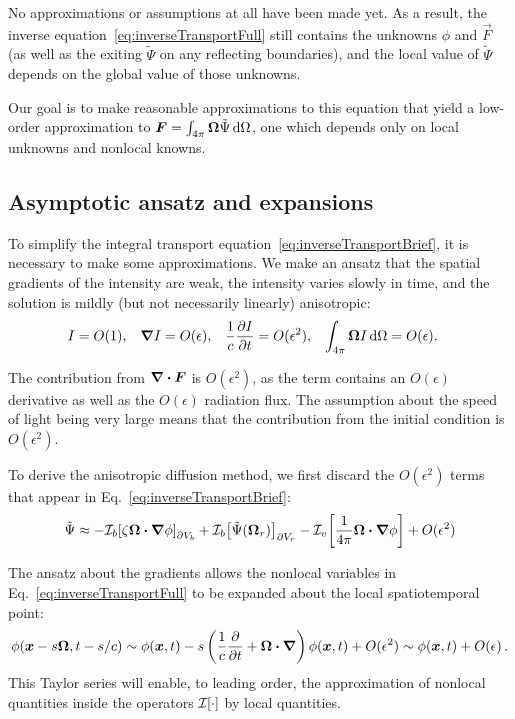 No approximations or assumptions at all have been made yet. As a
result, the inverse equation~\eqref{eq:inverseTransportFull} still contains
the unknowns $\phi$ and $\vec{F}$ (as well as the exiting $\tilde\Psi$ on
any reflecting boundaries), and the local value of
$\tilde\Psi$ depends on the global value of those unknowns.

Our goal is to make reasonable approximations to this equation that yield a
low-order approximation to $\bm{F}=\int_{4\pi}\bm{\Omega} \tilde\Psi
\mathop{}\!\mathrm{d}\Omega$, one which
depends only on local unknowns and nonlocal knowns.

\subsection{Asymptotic ansatz and expansions}
To simplify the integral transport
equation~\eqref{eq:inverseTransportBrief}, it is necessary to make some
approximations. We make an ansatz that the spatial gradients of the intensity
are weak, the intensity varies slowly in time, and the solution is mildly
(but not necessarily linearly) anisotropic:
\begin{align} \label{eq:ansatz}
  I &= O(1), &
  \bm{\nabla} I &= O(\epsilon), &
  \frac{1}{c}\frac{\partial I}{\partial t} &= O(\epsilon^2), &
  \int_{4\pi} \bm{\Omega} I\mathop{}\!\mathrm{d}\Omega &= O(\epsilon).
\end{align}

The contribution from $\bm{\nabla} \bm{\cdot}\bm{F}$ is $O(\epsilon^2)$, as the term
contains an $O(\epsilon)$ derivative as well as the $O(\epsilon)$ radiation
flux.  The assumption about the speed of light being very large means that the
contribution from the initial condition is $O(\epsilon^2)$.

To derive the anisotropic diffusion method, we first discard the $O(\epsilon^2)$
terms that appear in Eq.~\eqref{eq:inverseTransportBrief}:
\begin{equation} \label{eq:approxPsi1}
  \tilde\Psi \approx 
  -\mathcal{I}_{b}\!\left[\zeta \bm{\Omega}\bm{\cdot} \bm{\nabla} \phi\right]_{\partial V_b}
  + \mathcal{I}_{b}\!\left[\tilde\Psi(\bm{\Omega}_r)\right]_{\partial V_r}
  - \mathcal{I}_{v}\!\left[\frac{1}{4\pi} \bm{\Omega}\bm{\cdot} \bm{\nabla} \phi\right]
  + O(\epsilon^2)
\end{equation}

The ansatz about the gradients allows the nonlocal variables in
Eq.~\eqref{eq:inverseTransportFull} to be expanded about
the local spatiotemporal point:
\begin{equation} \label{eq:taylorPhi}
  \phi(\bm{x} - s \bm{\Omega}, t-s/c)
  \sim \phi(\bm{x},t) - s \left( \frac{1}{c} \frac{\partial }{\partial t} + \bm{\Omega} \bm{\cdot}
  \bm{\nabla}  \right) \phi (\bm{x}, t) + O(\epsilon^2) \sim \phi(\bm{x},t) +
  O(\epsilon) \,.
\end{equation}
This Taylor series will enable, to leading order, the approximation of nonlocal
quantities inside the operators $\mathcal{I}_{}\!\left[\cdot\right]$ by local quantities.

